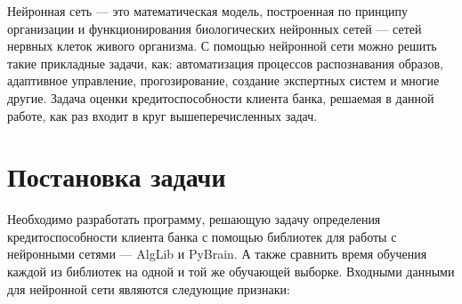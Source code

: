 
Нейронная сеть — это математическая модель, построенная по принципу организации
и функционирования биологических нейронных сетей — сетей нервных клеток живого
организма. С помощью нейронной сети можно решить такие
прикладные задачи, как: автоматизация процессов распознавания образов,
адаптивное управление, прогозирование, создание экспертных систем и многие
другие. Задача оценки кредитоспособности клиента банка, решаемая в данной
работе, как раз входит в круг вышеперечисленных задач.

\section{Постановка задачи}

Необходимо разработать программу, решающую задачу определения кредитоспособности
клиента банка с помощью библиотек для работы с нейронными сетями — AlgLib и
PyBrain. А также сравнить время обучения каждой из библиотек на одной и той же
обучающей выборке. Входными данными для нейронной сети являются следующие
признаки:

